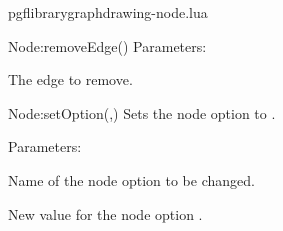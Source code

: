\begin{filedescription}{pgflibrarygraphdrawing-node.lua}
\begin{luacommand}{{Node:removeEdge}()}
Parameters:
\begin{parameterdescription}
	\item[\meta{edge}] The edge to remove. 
\end{parameterdescription}



\end{luacommand}
\begin{luacommand}{{Node:setOption}(,)}
Sets the node option  to . 

Parameters:
\begin{parameterdescription}
	\item[\meta{name}] Name of the node option to be changed.\item[\meta{value}] New value for the node option . 
\end{parameterdescription}



\end{luacommand}

\end{filedescription}